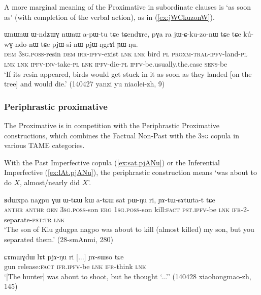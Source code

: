A more marginal meaning of the Proximative in subordinate clauses is `as soon as' (with completion of the verbal action), as in (\ref{ex:jWCkuzonW}).

 \begin{exe} 
\ex \label{ex:jWCkuzonW}
\gll  ɯnɯnɯ ɯ-ndʑɯɣ nɯnɯ a-pɯ-tu tɕe tɕendɤre, pɣa ra jɯ-ɕ-ku-zo-nɯ tɕe tɕe kú-wɣ-ndo-nɯ tɕe pjɯ-si-nɯ pjɯ-ŋgrɤl ɲɯ-ŋu. \\
\textsc{dem} \textsc{3sg}.\textsc{poss}-resin \textsc{dem} \textsc{irr}-\textsc{ipfv}-exist \textsc{lnk} \textsc{lnk} bird \textsc{pl} \textsc{proxm}-\textsc{tral}-\textsc{ipfv}-land-\textsc{pl} \textsc{lnk} \textsc{lnk} \textsc{ipfv}-\textsc{inv}-take-\textsc{pl} \textsc{lnk} \textsc{ipfv}-die-\textsc{pl} \textsc{ipfv}-be.usually.the.case \textsc{sens}-be \\
\glt `If its resin appeared, birds would get stuck in it as soon as they landed [on the tree] and would die.' (140427 yanzi yu niaolei-zh, 9)
 \end{exe}
 

 
\subsubsection{Periphrastic proximative} \label{sec:proximative.periphrastic}
The Proximative is in competition with the Periphrastic Proximative constructions, which combines the Factual Non-Past with the \textsc{3sg} copula in various TAME categories.

With the Past Imperfective copula  (\ref{ex:sat.pjANu}) or the Inferential Imperfective  (\ref{ex:lAt.pjANu}), the periphrastic construction means `was about to do $X$, almost/nearly did $X$'.

  \begin{exe} 
\ex \label{ex:sat.pjANu}
\gll ʁdɯxpa naχpu ɣɯ ɯ-tɕɯ kɯ a-tɕɯ sat pɯ-ŋu ri, ɲɤ-tɯ-sɤtɯta-t tɕe  \\
\textsc{anthr}  \textsc{anthr} \textsc{gen} \textsc{3sg}.\textsc{poss}-son \textsc{erg} \textsc{1sg}.\textsc{poss}-son kill:\textsc{fact} \textsc{pst}.\textsc{ipfv}-be \textsc{lnk} \textsc{ifr}-2-separate-\textsc{pst}:\textsc{tr} \textsc{lnk} \\
\glt `The son of Klu gdugpa nagpo was about to kill (almost killed) my son, but you separated them.' (28-smAnmi, 280)
 \end{exe}
 
  \begin{exe} 
\ex \label{ex:lAt.pjANu}
\gll  ɕɤmɯɣdɯ lɤt pjɤ-ŋu ri [...] ɲɤ-sɯso tɕe \\
gun release:\textsc{fact} \textsc{ifr}.\textsc{ipfv}-be \textsc{lnk} { } \textsc{ifr}-think \textsc{lnk} \\
\glt `[The hunter] was about to shoot, but he thought `...'' (140428 xiaohongmao-zh, 145)
 \end{exe}
 
